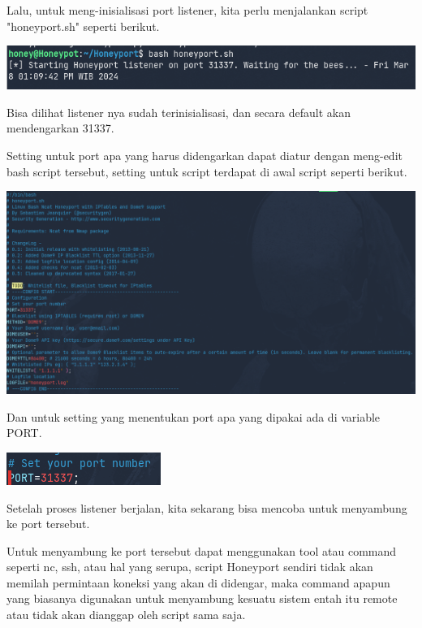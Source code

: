\documentclass[12pt, a4paper]{article}
\begin{document}
  Lalu, untuk meng-inisialisasi port listener, kita perlu menjalankan
  script "honeyport.sh" seperti berikut.

  \begin{center}
    \includegraphics[scale=0.5]{HONEYPORTEXEC}
  \end{center}

  Bisa dilihat listener nya sudah terinisialisasi, dan secara default akan
  mendengarkan 31337.

  Setting untuk port apa yang harus didengarkan dapat diatur dengan meng-edit
  bash script tersebut, setting untuk script terdapat di awal script seperti
  berikut.

  \begin{center}
    \includegraphics[scale=0.3]{HONEYPORTCONF}
  \end{center}

  Dan untuk setting yang menentukan port apa yang dipakai ada di variable
  PORT.

  \begin{center}
    \includegraphics[scale=0.8]{PORTCONF}
  \end{center}

  Setelah proses listener berjalan, kita sekarang bisa mencoba untuk menyambung
  ke port tersebut.

  Untuk menyambung ke port tersebut dapat menggunakan tool atau command seperti
  nc, ssh, atau hal yang serupa, script Honeyport sendiri tidak akan memilah
  permintaan koneksi yang akan di didengar, maka command apapun yang biasanya
  digunakan untuk menyambung kesuatu sistem entah itu remote atau tidak akan
  dianggap oleh script sama saja.
\end{document}
